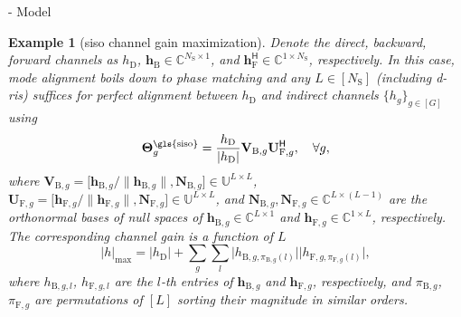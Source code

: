 \documentclass[journal]{IEEEtran}
\newtheorem{example}{Example}
\begin{document}
\begin{section}{- Model}

	\begin{example}[\gls{siso} channel gain maximization]\label{eg:siso_gain}
		Denote the direct, backward, forward channels as $h_\mathrm{D}$, $\mathbf{h}_\mathrm{B} \in \mathbb{C}^{N_\mathrm{S} \times 1}$, and $\mathbf{h}_\mathrm{F}^\mathsf{H} \in \mathbb{C}^{1 \times N_\mathrm{S}}$, respectively.
		In this case, mode alignment boils down to phase matching and any $L \in [N_\mathrm{S}]$ (including \gls{d}-\gls{ris}) suffices for perfect alignment between $h_\mathrm{D}$ and indirect channels $\{h_g\}_{g \in [G]}$ using
		\begin{equation}
			\mathbf{\Theta}_g^\textnormal{\gls{siso}} = \frac{h_\mathrm{D}}{\lvert h_\mathrm{D} \rvert} \mathbf{V}_{\mathrm{B},g} \mathbf{U}_{\mathrm{F},g}^\mathsf{H}, \quad \forall g,
			\label{eq:scattering_siso}
		\end{equation}
		where $\mathbf{V}_{\mathrm{B},g} = \bigl[\mathbf{h}_{\mathrm{B},g}/\lVert \mathbf{h}_{\mathrm{B},g} \rVert, \mathbf{N}_{\mathrm{B},g}\bigr] \in \mathbb{U}^{L \times L}$, $\mathbf{U}_{\mathrm{F},g} = \bigl[\mathbf{h}_{\mathrm{F},g}/\lVert \mathbf{h}_{\mathrm{F},g} \rVert, \mathbf{N}_{\mathrm{F},g}\bigr] \in \mathbb{U}^{L \times L}$, and $\mathbf{N}_{\mathrm{B},g}, \mathbf{N}_{\mathrm{F},g} \in \mathbb{C}^{L \times (L-1)}$ are the orthonormal bases of null spaces of $\mathbf{h}_{\mathrm{B},g} \in \mathbb{C}^{L \times 1}$ and $\mathbf{h}_{\mathrm{F},g} \in \mathbb{C}^{1 \times L}$, respectively.
		The corresponding channel gain is a function of $L$
		\begin{equation}
			\lvert h \rvert _{\max} = \lvert h_\mathrm{D} \rvert + \sum_g \sum_l \lvert h_{\mathrm{B},g,\pi_{\mathrm{B},g}(l)} \rvert \lvert h_{\mathrm{F},g,\pi_{\mathrm{F},g}(l)} \rvert,
			\label{eq:gain_siso}
		\end{equation}
		where $h_{\mathrm{B},g,l}$, $h_{\mathrm{F},g,l}$ are the $l$-th entries of $\mathbf{h}_{\mathrm{B},g}$ and $\mathbf{h}_{\mathrm{F},g}$, respectively, and $\pi_{\mathrm{B},g}$, $\pi_{\mathrm{F},g}$ are permutations of $[L]$ sorting their magnitude in similar orders.

\end{example}
\end{section}
\end{document}
